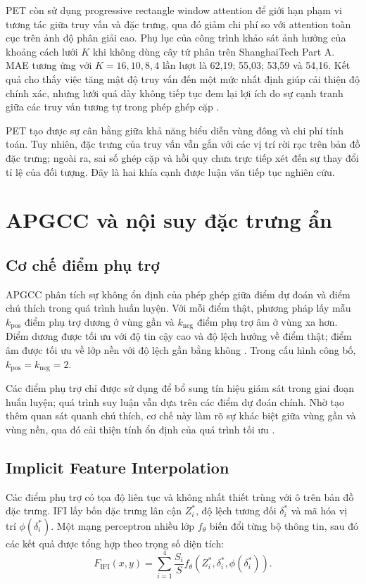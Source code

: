 PET còn sử dụng progressive rectangle window attention để giới hạn phạm vi tương tác giữa truy vấn và đặc trưng, qua đó giảm chi phí so với attention toàn cục trên ảnh độ phân giải cao. Phụ lục của công trình khảo sát ảnh hưởng của khoảng cách lưới $K$ khi không dùng cây tứ phân trên ShanghaiTech Part A. MAE tương ứng với $K=16,10,8,4$ lần lượt là 62,19; 55,03; 53,59 và 54,16. Kết quả cho thấy việc tăng mật độ truy vấn đến một mức nhất định giúp cải thiện độ chính xác, nhưng lưới quá dày không tiếp tục đem lại lợi ích do sự cạnh tranh giữa các truy vấn tương tự trong phép ghép cặp \cite{liu2023pet}.

PET tạo được sự cân bằng giữa khả năng biểu diễn vùng đông và chi phí tính toán. Tuy nhiên, đặc trưng của truy vấn vẫn gắn với các vị trí rời rạc trên bản đồ đặc trưng; ngoài ra, sai số ghép cặp và hồi quy chưa trực tiếp xét đến sự thay đổi tỉ lệ của đối tượng. Đây là hai khía cạnh được luận văn tiếp tục nghiên cứu.

\section{APGCC và nội suy đặc trưng ẩn}

\subsection{Cơ chế điểm phụ trợ}

APGCC phân tích sự không ổn định của phép ghép giữa điểm dự đoán và điểm chú thích trong quá trình huấn luyện. Với mỗi điểm thật, phương pháp lấy mẫu $k_{\mathrm{pos}}$ điểm phụ trợ dương ở vùng gần và $k_{\mathrm{neg}}$ điểm phụ trợ âm ở vùng xa hơn. Điểm dương được tối ưu với độ tin cậy cao và độ lệch hướng về điểm thật; điểm âm được tối ưu về lớp nền với độ lệch gần bằng không \cite{chen2024apgcc}. Trong cấu hình công bố, $k_{\mathrm{pos}}=k_{\mathrm{neg}}=2$.

Các điểm phụ trợ chỉ được sử dụng để bổ sung tín hiệu giám sát trong giai đoạn huấn luyện; quá trình suy luận vẫn dựa trên các điểm dự đoán chính. Nhờ tạo thêm quan sát quanh chú thích, cơ chế này làm rõ sự khác biệt giữa vùng gần và vùng nền, qua đó cải thiện tính ổn định của quá trình tối ưu \cite{chen2024apgcc}.

\subsection{Implicit Feature Interpolation}

Các điểm phụ trợ có tọa độ liên tục và không nhất thiết trùng với ô trên bản đồ đặc trưng. IFI lấy bốn đặc trưng lân cận $Z_i^*$, độ lệch tương đối $\delta_i^*$ và mã hóa vị trí $\phi(\delta_i^*)$. Một mạng perceptron nhiều lớp $f_\theta$ biến đổi từng bộ thông tin, sau đó các kết quả được tổng hợp theo trọng số diện tích:
\begin{equation}
 F_{\mathrm{IFI}}(x,y)
 =\sum_{i=1}^{4}\frac{S_i}{S}
 f_{\theta}\!\left(Z_i^*,\delta_i^*,\phi(\delta_i^*)\right).
 \label{eq:ifi}
\end{equation}

